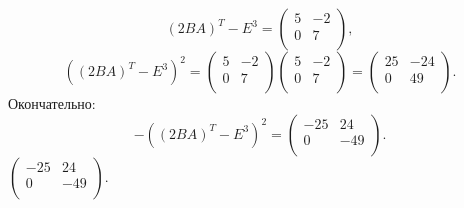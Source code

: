 \documentclass[a4paper,12pt]{article}
\begin{document}
$$(2BA)^T-E^3 =
\begin{pmatrix}
5 & -2\\
0 & 7 \\
\end{pmatrix}, $$
$$((2BA)^T-E^3)^2 = 
\begin{pmatrix}
5 & -2\\
0 & 7 \\
\end{pmatrix}
\begin{pmatrix}
5 & -2\\
0 & 7 \\
\end{pmatrix} =
\begin{pmatrix}
25 & -24\\
0 & 49 \\
\end{pmatrix}.$$
Окончательно:
$$-((2BA)^T-E^3)^2=
\begin{pmatrix}
-25 & 24\\
0 & -49 \\
\end{pmatrix}.$$
 $\begin{pmatrix}
-25 & 24\\
0 & -49 \\
\end{pmatrix}.$
\newpage
\end{document}
